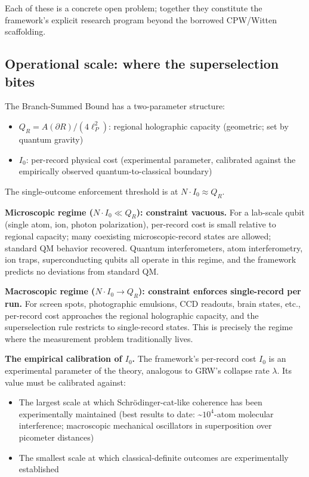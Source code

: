 \documentclass[11pt,a4paper]{article}
\begin{document}
Each of these is a concrete open problem; together they constitute the framework's explicit research program beyond the borrowed CPW/Witten scaffolding.

\subsection{Operational scale: where the superselection bites}

The Branch-Summed Bound has a two-parameter structure:
\begin{itemize}
  \item $Q_R = A(\partial R)/(4\ell_P^2)$: regional holographic capacity (geometric; set by quantum gravity)
  \item $I_0$: per-record physical cost (experimental parameter, calibrated against the empirically observed quantum-to-classical boundary)
\end{itemize}

The single-outcome enforcement threshold is at $N \cdot I_0 \approx Q_R$.

\textbf{Microscopic regime ($N \cdot I_0 \ll Q_R$): constraint vacuous.} For a lab-scale qubit (single atom, ion, photon polarization), per-record cost is small relative to regional capacity; many coexisting microscopic-record states are allowed; standard QM behavior recovered. Quantum interferometers, atom interferometry, ion traps, superconducting qubits all operate in this regime, and the framework predicts no deviations from standard QM.

\textbf{Macroscopic regime ($N \cdot I_0 \to Q_R$): constraint enforces single-record per run.} For screen spots, photographic emulsions, CCD readouts, brain states, etc., per-record cost approaches the regional holographic capacity, and the superselection rule restricts to single-record states. This is precisely the regime where the measurement problem traditionally lives.

\textbf{The empirical calibration of $I_0$.} The framework's per-record cost $I_0$ is an experimental parameter of the theory, analogous to GRW's collapse rate $\lambda$. Its value must be calibrated against:
\begin{itemize}
  \item The largest scale at which Schrödinger-cat-like coherence has been experimentally maintained (best results to date: \textasciitilde{}$10^4$-atom molecular interference; macroscopic mechanical oscillators in superposition over picometer distances)
  \item The smallest scale at which classical-definite outcomes are experimentally established
\end{itemize}
\end{document}
